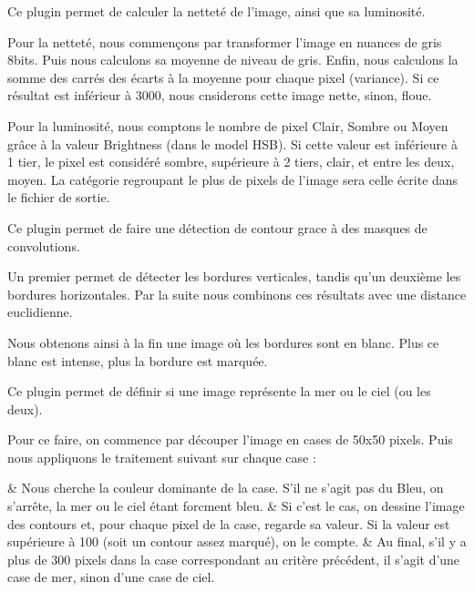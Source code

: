 \documentclass{report}
\begin{document}
			Ce plugin permet de calculer la netteté de l'image, ainsi que sa luminosité.
			
			Pour la netteté, nous commençons par transformer l'image en nuances de gris 8bits. Puis nous calculons sa moyenne de niveau de gris. Enfin, nous calculons la somme des carrés des écarts à la moyenne pour chaque pixel (variance). Si ce résultat est inférieur à 3000, nous cnsiderons cette image nette, sinon, floue. 
			
			Pour la luminosité, nous comptons le nombre de pixel Clair, Sombre ou Moyen grâce à la valeur Brightness (dans le model HSB). Si cette valeur est inférieure à 1 tier, le pixel est considéré sombre, supérieure à 2 tiers, clair, et entre les deux, moyen. La catégorie regroupant le plus de pixels de l'image sera celle écrite dans le fichier de sortie.
			
			
			
			Ce plugin permet de faire une détection de contour grace à des masques de convolutions.
			
			Un premier permet de détecter les bordures verticales, tandis qu'un deuxième les bordures horizontales. Par la suite nous combinons ces résultats avec une distance euclidienne.
			
			Nous obtenons ainsi à la fin une image où les bordures sont en blanc. Plus ce blanc est intense, plus la bordure est marquée.
			
			
			
			Ce plugin permet de définir si une image représente la mer ou le ciel (ou les deux).
			
			Pour ce faire, on commence par découper l'image en cases de 50x50 pixels. Puis nous appliquons le traitement suivant sur chaque case :
			\begin{easylist}
			& Nous cherche la couleur dominante de la case. S'il ne s'agit pas du Bleu, on s'arrête, la mer ou le ciel étant forcment bleu.
			& Si c'est le cas, on dessine l'image des contours et, pour chaque pixel de la case, regarde sa valeur. Si la valeur est supérieure à 100 (soit un contour assez marqué), on le compte.
			& Au final, s'il y a plus de 300 pixels dans la case correspondant au critère précédent, il s'agit d'une case de mer, sinon d'une case de ciel.
			\end{easylist}		
			
			
\end{document}
